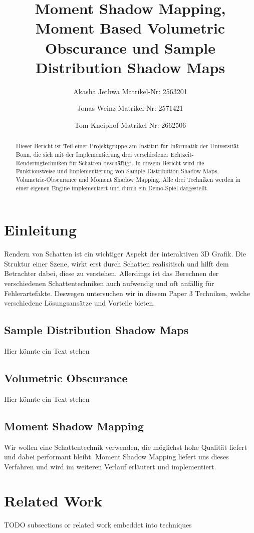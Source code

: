 \documentclass[runningheaders,a4paper]{llncs}
\title{ Moment Shadow Mapping, Moment Based Volumetric Obscurance und Sample Distribution Shadow Maps }
\author{
	Akasha Jethwa 
	Matrikel-Nr: 2563201
	\and
	Jonas Weinz 
	Matrikel-Nr: 2571421
	\and
	Tom Kneiphof 
	Matrikel-Nr: 2662506
}
\institute{Institut für Informatik der Universität Bonn}
\begin{document}
\maketitle

\begin{abstract}
Dieser Bericht ist Teil einer Projektgruppe am Institut für Informatik der Universität Bonn,
die sich mit der Implementierung drei verschiedener Echtzeit-Renderingtechniken für Schatten 
beschäftigt. In diesem Bericht wird die Funktionsweise und Implementierung von Sample Distribution Shadow Maps, 
Volumetric-Obscurance und Moment Shadow Mapping. Alle drei Techniken werden in einer eigenen Engine implementiert und
durch ein Demo-Spiel dargestellt.
\end{abstract}

\section{Einleitung}
Rendern von Schatten ist ein wichtiger Aspekt der interaktiven 3D Grafik. Die Struktur einer Szene, wirkt erst durch Schatten realisitisch und hilft dem Betrachter dabei, diese zu verstehen.
Allerdings ist das Berechnen der verschiedenen Schattentechniken auch aufwendig und oft anfällig für Fehlerartefakte. Deswegen untersuchen wir in diesem Paper 3 Techniken, welche verschiedene Lösungsansätze und Vorteile bieten.
\subsection{Sample Distribution Shadow Maps}
Hier könnte ein Text stehen
\subsection{Volumetric Obscurance}
Hier könnte ein Text stehen
\subsection{Moment Shadow Mapping}
Wir wollen eine Schattentechnik verwenden, die möglichst hohe Qualität liefert und dabei performant bleibt. Moment Shadow Mapping liefert uns dieses Verfahren und wird im weiteren Verlauf erläutert und implementiert.

\section{Related Work}

TODO subsections or related work embeddet into techniques
\end{document}
